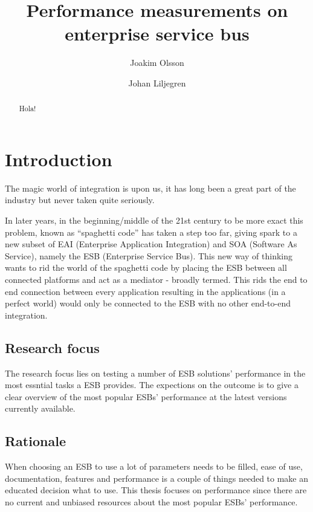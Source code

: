 \documentclass{llncs}
\title{Performance measurements on enterprise service bus}
\author{Joakim Olsson \inst{1} \and Johan Liljegren\inst{1}}
\institute{
	Blekinge Institute of Technology \\
	\email{laggmonkei@gmail.com}, \email{datanizze@gmail.com}
}
\begin{document}
\maketitle
\begin{abstract}
Hola!
\end{abstract}

\section{Introduction}
The magic world of integration is upon us, it has long been a great part of the industry but never taken quite seriously.

In later years, in the beginning/middle of the 21st century to be more exact this problem, known as ``spaghetti code'' has taken a step too far, giving spark to a new subset of EAI (Enterprise Application Integration) and SOA  (Software As Service), namely the ESB (Enterprise Service Bus).
This new way of thinking wants to rid the world of the spaghetti code by placing the ESB between all connected platforms and act as a mediator - broadly termed. 
This rids the end to end connection between every application resulting in the applications (in a perfect world) would only be connected to the ESB with no other end-to-end integration.

\subsection{Research focus}
The research focus lies on testing a number of ESB solutions' performance in the most essntial tasks a ESB provides. The expections on the outcome is to give a clear overview of the most popular ESBs' performance at the latest versions currently available.

\subsection{Rationale}
When choosing an ESB to use a lot of parameters needs to be filled, ease of use, documentation, features and performance is a couple of things needed to make an educated decision what to use. This thesis focuses on performance since there are no current and unbiased resources about the most popular ESBs' performance.
\end{document}
